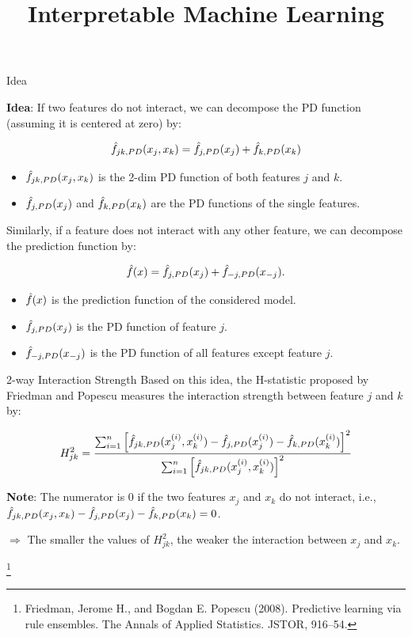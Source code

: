 \documentclass[11pt,compress,t,notes=noshow, xcolor=table]{beamer}
\title{Interpretable Machine Learning}
\institute{\href{https://compstat-lmu.github.io/lecture_iml/}{compstat-lmu.github.io/lecture\_iml}}
\date{}
\begin{document}




\begin{vbframe}{Idea}

	\textbf{Idea}: If two features do not interact, we can decompose the PD function (assuming it is centered at zero) by:

	$$\fh_{jk, PD}(x_j, x_k) = \fh_{j, PD}(x_j) + \fh_{k, PD}(x_k)$$

\begin{itemize}
	\item $\fh_{jk, PD}(x_j, x_k)$ is the 2-dim PD function of both features $j$ and $k$.
	\item $\fh_{j, PD}(x_j)$ and $\fh_{k, PD}(x_k)$ are the PD functions of the single features.
\end{itemize}

\framebreak

	Similarly, if a feature does not interact with any other feature, we can decompose the prediction function by:

	$$\fh(x) = \fh_{j, PD}(x_j) +  \fh_{-j, PD}(x_{-j}).$$

\begin{itemize}
	\item $\fh(x)$ is the prediction function of the considered model.
	\item $\fh_{j, PD}(x_j)$ is the PD function of feature $j$.
	\item $\fh_{-j, PD}(x_{-j})$ is the PD function of all features except feature $j$.
\end{itemize}
\end{vbframe}

\begin{vbframe}{2-way Interaction Strength}
Based on this idea, the H-statistic proposed by Friedman and Popescu measures the interaction strength between feature $j$ and $k$ by:

	$$H^2_{jk} = \frac{\sum_{i=1}^n\left[\fh_{jk,PD}(x_j^{(i)}, x_k^{(i)}) - \fh_{j, PD}(x_j^{(i)}) - \fh_{k, PD}(x_k^{(i)})  \right]^2}{\sum_{i=1}^n \left[\fh_{jk,PD}(x_j^{(i)}, x_k^{(i)}) \right]^2}$$

\textbf{Note}: The numerator is $0$ if the two features $x_j$ and $x_k$ do not interact, i.e., $\fh_{jk, PD}(x_j, x_k) - \fh_{j, PD}(x_j) - \fh_{k, PD}(x_k) = 0$.

$\Rightarrow$ The smaller the values of $H^2_{jk}$, the weaker the interaction between $x_j$ and $x_k$.


\footnote[frame]{Friedman, Jerome H., and Bogdan E. Popescu (2008). Predictive learning via rule ensembles. The Annals of Applied Statistics. JSTOR, 916–54.}

\end{vbframe}
\end{document}
